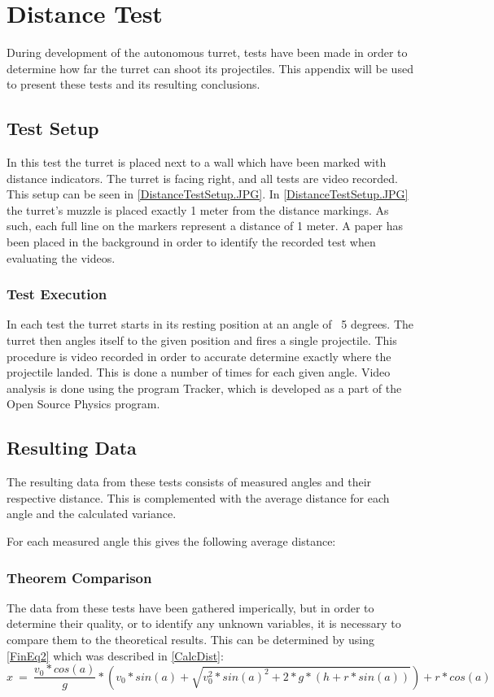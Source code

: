 \chapter{Distance Test}
During development of the autonomous turret, tests have been made in order to
determine how far the turret can shoot its projectiles. This appendix will be
used to present these tests and its resulting conclusions.

\section{Test Setup}
In this test the turret is placed next to a wall which have been marked with
distance indicators. The turret is facing right, and all tests are video
recorded. This setup can be seen in \autoref{DistanceTestSetup.JPG}.
 In \autoref{DistanceTestSetup.JPG} the turret's muzzle is placed exactly 1 meter
from the distance markings. As such, each full line on the markers represent a
distance of 1 meter. A paper has been placed in the background in order to
identify the recorded test when evaluating the videos. 

\subsection{Test Execution}
In each test the turret starts in its resting position at an angle of ~5
degrees. The turret then angles itself to the given position and fires a single
projectile. This procedure is video recorded in order to accurate determine
exactly where the projectile landed. This is done a number of times for each
given angle. Video analysis is done using the program Tracker, which is
developed as a part of the Open Source Physics program.

\section{Resulting Data}
The resulting data from these tests consists of measured angles and their
respective distance. This is complemented with the average distance for each
angle and the calculated variance.

For each measured angle this gives the following average distance:

\subsection{Theorem Comparison}
The data from these tests have been gathered imperically, but in order to
determine their quality, or to identify any unknown variables, it is necessary
to compare them to the theoretical results. This can be determined by using
\autoref{FinEq2} which was described in \autoref{CalcDist}:
\begin{equation}\label{FinEq2}
x\ =\ \frac{v_0*cos(a)}{g}* \left(
v_0*sin(a)+\sqrt{v_0^2*sin(a)^2+2*g*(h+r*sin(a))}\right)+r*cos(a)
\end{equation}

